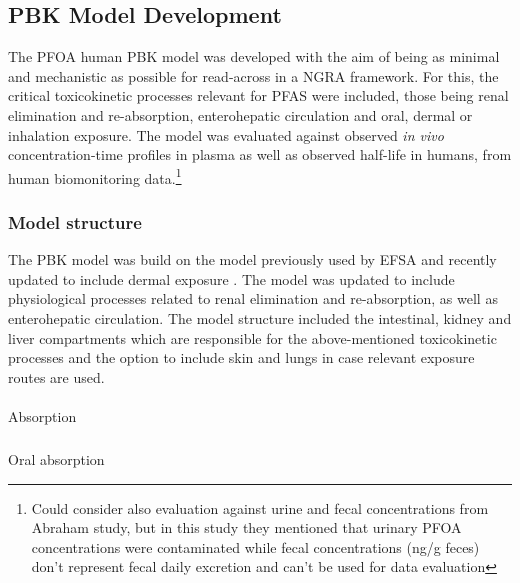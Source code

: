 \documentclass[
  authoryear,
  preprint]{elsarticle}
\makeatletter
\let\oldparagraph\paragraph
\renewcommand{\paragraph}{
    \@ifstar
      \xxxParagraphStar
      \xxxParagraphNoStar
  }
\newcommand{\xxxParagraphStar}[1]{\oldparagraph*{#1}\mbox{}}
\newcommand{\xxxParagraphNoStar}[1]{\oldparagraph{#1}\mbox{}}
\let\oldsubparagraph\subparagraph
\renewcommand{\subparagraph}{
    \@ifstar
      \xxxSubParagraphStar
      \xxxSubParagraphNoStar
  }
\newcommand{\xxxSubParagraphStar}[1]{\oldsubparagraph*{#1}\mbox{}}
\newcommand{\xxxSubParagraphNoStar}[1]{\oldsubparagraph{#1}\mbox{}}
\makeatother
\begin{document}
\subsection{PBK Model Development}\label{pbk-model-development}

The PFOA human PBK model was developed with the aim of being as minimal
and mechanistic as possible for read-across in a NGRA framework. For
this, the critical toxicokinetic processes relevant for PFAS were
included, those being renal elimination and re-absorption, enterohepatic
circulation and oral, dermal or inhalation exposure. The model was
evaluated against observed \emph{in vivo} concentration-time profiles in
plasma as well as observed half-life in humans, from human biomonitoring
data.\footnote{Could consider also evaluation against urine and fecal
  concentrations from Abraham study, but in this study they mentioned
  that urinary PFOA concentrations were contaminated while fecal
  concentrations (ng/g feces) don't represent fecal daily excretion and
  can't be used for data evaluation}

\subsubsection{Model structure}\label{model-structure}

The PBK model was build on the model previously used by EFSA and
recently updated to include dermal exposure \citep{husøy2023}. The model
was updated to include physiological processes related to renal
elimination and re-absorption, as well as enterohepatic circulation. The
model structure included the intestinal, kidney and liver compartments
which are responsible for the above-mentioned toxicokinetic processes
and the option to include skin and lungs in case relevant exposure
routes are used.

\paragraph{Absorption}\label{absorption}

\subparagraph{Oral absorption}\label{oral-absorption}
\end{document}
